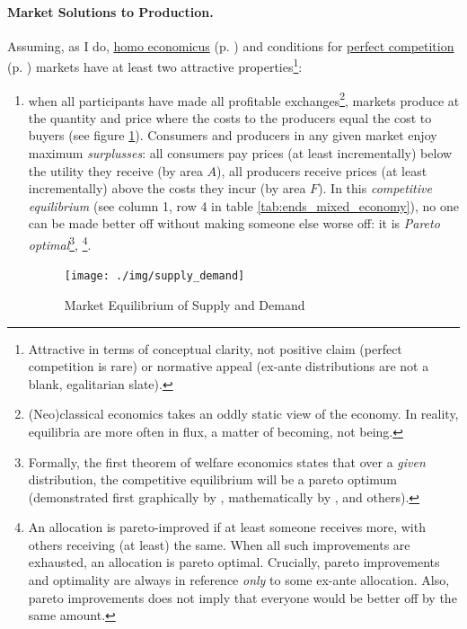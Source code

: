 \paragraph{Market Solutions to Production.}  \label{sec:market_solutions_production} Assuming, as I do, \hyperref[it:homo_economicus]{homo economicus} (p. \pageref{it:homo_economicus})  and conditions for \hyperref[sec:perfect_competition]{perfect competition} (p. \pageref{sec:perfect_competition}) markets have at least two attractive properties\footnote
	{Attractive in terms of conceptual clarity, not positive claim (perfect competition is rare) or normative appeal (ex-ante distributions are not a blank, egalitarian slate).}:
\begin{enumerate}
	\item when all  participants have made all profitable exchanges\footnote
		{(Neo)classical economics takes an oddly static view of the economy. In reality, equilibria are more often in flux, a matter of becoming, not being.}, 
	markets produce at the quantity and price where the costs to the producers equal the cost to buyers (see figure \ref{fig:supply_demand}). Consumers and producers in any given market enjoy maximum \emph{surplusses}: all consumers pay prices (at least incrementally) below the utility they receive (by area $A$), all producers receive prices (at least incrementally) above the costs they incur (by area $F$). In this \emph{competitive equilibrium} (see column 1, row 4 in table \ref{tab:ends_mixed_economy}), no one can be made better off without making someone else worse off: it is \emph{Pareto optimal}\footnote{
		\label{fn:1st_theorem} Formally, the first theorem of welfare economics states that over a \emph{given} distribution, the competitive equilibrium will be a pareto optimum (demonstrated first graphically by \cite{Lerner1944}, mathematically by \cite{Lange1934}, \cite{Debreu1954} and others).},
		\footnote{An allocation is pareto-improved if at least someone receives more, with others receiving (at least) the same. When all such improvements are exhausted, an allocation is pareto optimal. Crucially, pareto improvements and optimality are always in reference \emph{only} to some ex-ante allocation. Also, pareto improvements does not imply that everyone would be better off by the same amount.}. 
	\begin{figure}[htbp]
		\centering
		\texttt{[image: ./img/supply\_demand]}  
		\caption{Market Equilibrium of Supply and Demand}
		\label{fig:supply_demand}
	\end{figure}

\end{enumerate}
